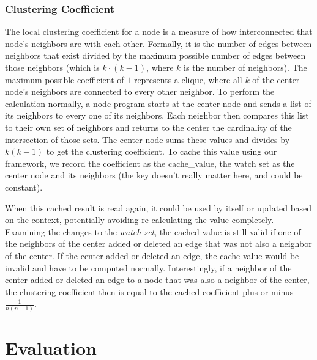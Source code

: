 \documentclass[letterpaper,twocolumn,11pt,tight]{article}
\begin{document}
\subsubsection{Clustering Coefficient}\label{sec:clustering}
The local clustering coefficient for a node is a measure of how interconnected that node's neighbors are with each other.
Formally, it is the number of edges between neighbors that exist divided by the maximum possible number of edges between those neighbors (which is $k\cdot(k-1)$, where $k$ is the number of neighbors).
The maximum possible coefficient of $1$ represents a clique, where all $k$ of the center node's neighbors are connected to every other neighbor.
To perform the calculation normally, a node program starts at the center node and sends a list of its neighbors to every one of its neighbors.
Each neighbor then compares this list to their own set of neighbors and returns to the center the cardinality of the intersection of those sets.
The center node sums these values and divides by $k(k-1)$ to get the clustering coefficient. To cache this value using our framework, we record the coefficient as the cache\_value, the watch set as the center node and its neighbors (the key doesn't really matter here, and could be constant).

    When this cached result is read again, it could be used by itself or updated based on the context, potentially avoiding re-calculating the value completely.
    Examining the changes to the \emph{watch set}, the cached value is still valid if one of the neighbors of the center added or deleted an edge that was not also a neighbor of the center.
    If the center added or deleted an edge, the cache value would be invalid and have to be computed normally. Interestingly, if a neighbor of the center added or deleted an edge to a node that was also a neighbor of the center, the clustering coefficient then is equal to the cached coefficient plus or minus $\frac1{n(n-1)}$. 
\section{Evaluation}\label{sec:eval}
\end{document}
